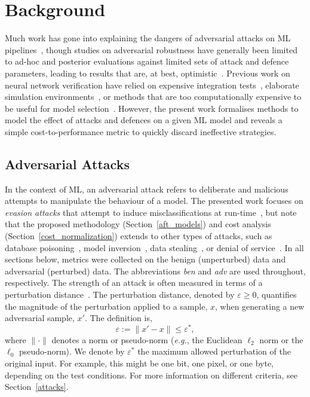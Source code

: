 \section{Background}
Much work has gone into explaining the dangers of adversarial attacks on ML pipelines~\cite{carlini_towards_2017,croce_reliable_2020,pixelattack,fgm,biggio_evasion_2013}, though studies on adversarial robustness have generally been limited to ad-hoc and posterior evaluations against limited sets of attack and defence parameters, leading to results that are, at best, optimistic~\cite{meyers,ma2020imbalanced}. Previous work on neural network verification have relied on expensive integration tests~\cite{vehicle_testing_review}, elaborate simulation environments~\cite{vehicle_formal}, or methods that are too computationally expensive to be useful for model selection~\cite{formal_adversarial}.
However, the present work formalises methods to model the effect of attacks and defences on a given ML model and reveals a simple cost-to-performance metric to quickly discard ineffective strategies.

\subsection{Adversarial Attacks}
In the context of ML, an adversarial attack refers to deliberate and malicious attempts to manipulate the behaviour of a model. The presented work focuses on \textit{evasion attacks} that attempt to induce misclassifications at run-time~\cite{carlini_towards_2017,biggio_evasion_2013}, but note that the proposed methodology (Section~\ref{aft_models}) and cost analysis (Section~\ref{cost_normalization}) extends to other types of attacks, such as database poisoning~\cite{biggio_poisoning_2013,saha2020hidden}, model inversion~\cite{choquette2021label,li2021membership}, data stealing~\cite{orekondy2019knockoff}, or denial of service~\cite{santos2021universal}. In all sections below, metrics were collected on the benign (unperturbed) data and adversarial (perturbed) data. The abbreviations \textit{ben} and \textit{adv} are used throughout, respectively.
The strength of an attack is often measured in terms of a perturbation distance~\cite{croce_reliable_2020,chakraborty_adversarial_2018,pixelattack}. The perturbation distance, denoted by $\varepsilon\geq0$, quantifies the magnitude of the perturbation applied to a sample, $x$, when generating a new adversarial sample, $x'$. The definition is,
\begin{equation}
    \varepsilon := \| x' - x \| \leq \varepsilon^*,
    \label{eq:perturbation_distance}
\end{equation}
where $\| \cdot \|$ denotes a norm or pseudo-norm (\textit{e.g.}, the Euclidean $\ell_2$ norm or the $\ell_0$ pseudo-norm). We denote by $\varepsilon^*$ the maximum allowed perturbation of the original input. For example, this might be one bit, one pixel, or one byte, depending on the test conditions. For more information on different criteria, see Section~\ref{attacks}.



